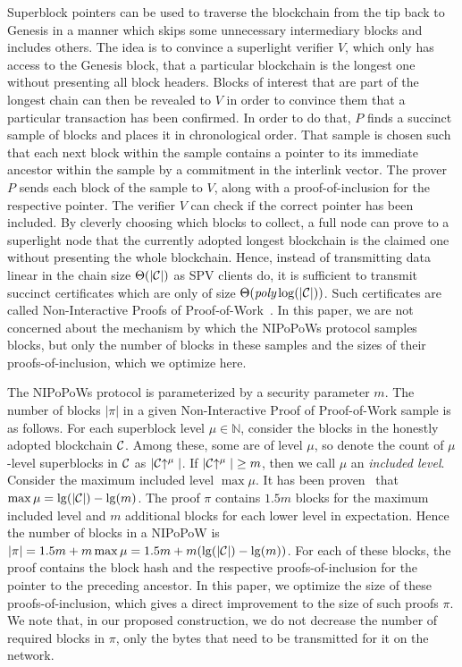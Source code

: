Superblock pointers can be used to traverse the blockchain from the tip back to
Genesis in a manner which skips some unnecessary intermediary blocks and
includes others. The idea is to convince a superlight verifier $V$, which only
has access to the Genesis block, that a particular blockchain is the longest one
without presenting all block headers. Blocks of interest that are part of the
longest chain can then be revealed to $V$ in order to convince them that a
particular transaction has been confirmed. In order to do that, $P$ finds a
succinct sample of blocks and places it in chronological order. That sample is
chosen such that each next block within the sample contains a pointer to its
immediate ancestor within the sample by a commitment in the interlink vector.
The prover $P$ sends each block of the sample to $V$, along with a
proof-of-inclusion for the respective pointer. The verifier $V$ can check if the
correct pointer has been included. By cleverly choosing which blocks to collect,
a full node can prove to a superlight node that the currently adopted longest
blockchain is the claimed one without presenting the whole blockchain. Hence,
instead of transmitting data linear in the chain size $\Theta(|\mathcal{C}|)$ as SPV
clients do, it is sufficient to transmit succinct certificates which are only of
size $\Theta(\emph{poly}\log(|\mathcal{C}|))$. Such certificates are called
Non-Interactive Proofs of Proof-of-Work~\cite{nipopows}. In this paper, we are
not concerned about the mechanism by which the NIPoPoWs protocol samples blocks,
but only the number of blocks in these samples and the sizes of their
proofs-of-inclusion, which we optimize here.

The NIPoPoWs protocol is parameterized by a security parameter $m$. The number
of blocks $|\pi|$ in a given Non-Interactive Proof of Proof-of-Work sample is as
follows. For each superblock level $\mu \in \mathbb{N}$, consider the
blocks in the honestly adopted blockchain $\mathcal{C}$. Among these, some
are of level $\mu$, so denote the count of $\mu$-level superblocks in $\mathcal{C}$
as $|\mathcal{C}\negthickspace\uparrow^\mu|$. If $|\mathcal{C}\negthickspace\uparrow^\mu| \geq m$, then we call $\mu$
an \emph{included level}. Consider the maximum included level $\max\mu$. It has
been proven~\cite{nipopows} that $\max\mu = \lg(|\mathcal{C}|) - \lg(m)$. The proof
$\pi$ contains $1.5m$ blocks for the maximum included level and $m$ additional blocks for
each lower level in expectation. Hence the number of blocks in a NIPoPoW is
$|\pi| = 1.5m + m \max\mu = 1.5m + m(\lg(|\mathcal{C}|) - \lg(m))$. For each of
these blocks, the proof contains the block hash and the respective
proofs-of-inclusion for the pointer to the preceding ancestor. In this paper, we
optimize the size of these proofs-of-inclusion, which gives a direct improvement
to the size of such proofs $\pi$. We note that, in our proposed construction,
we do not decrease the number of required blocks in $\pi$, only the bytes that
need to be transmitted for it on the network.


